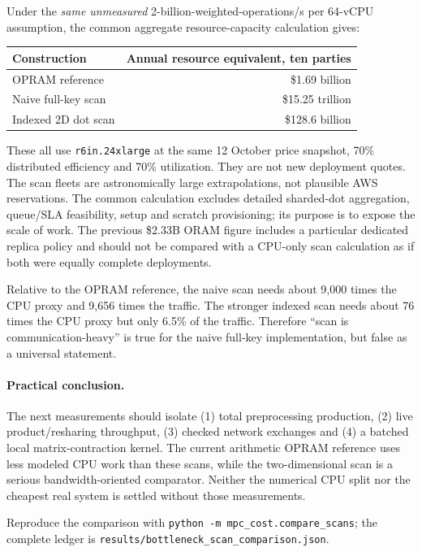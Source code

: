 Under the \emph{same unmeasured} 2-billion-weighted-operations/s per 64-vCPU assumption,
the common aggregate resource-capacity calculation gives:
\begin{center}\begin{tabular}{lr}\toprule
Construction & Annual resource equivalent, ten parties\\\midrule
OPRAM reference & \$1.69 billion\\
Naive full-key scan & \$15.25 trillion\\
Indexed 2D dot scan & \$128.6 billion\\\bottomrule\end{tabular}\end{center}
These all use \texttt{r6in.24xlarge} at the same 12 October price snapshot, 70\%
distributed efficiency and 70\% utilization. They are not new deployment quotes.
The scan fleets are astronomically large extrapolations, not plausible AWS
reservations. The common calculation excludes detailed sharded-dot aggregation,
queue/SLA feasibility, setup and scratch provisioning; its purpose is to expose
the scale of work. The previous \$2.33B ORAM figure includes a particular dedicated
replica policy and should not be compared with a CPU-only scan calculation as
if both were equally complete deployments.

Relative to the OPRAM reference, the naive scan needs about 9,000 times the CPU
proxy and 9,656 times the traffic. The stronger indexed scan needs about 76 times
the CPU proxy but only 6.5\% of the traffic. Therefore ``scan is communication-heavy''
is true for the naive full-key implementation, but false as a universal statement.

\paragraph{Practical conclusion.}
The next measurements should isolate (1) total preprocessing production,
(2) live product/resharing throughput, (3) checked network exchanges and
(4) a batched local matrix-contraction kernel. The current arithmetic OPRAM
reference uses less modeled CPU work than these scans, while the two-dimensional scan is
a serious bandwidth-oriented comparator. Neither the numerical CPU split nor
the cheapest real system is settled without those measurements.

Reproduce the comparison with \texttt{python -m mpc\_cost.compare\_scans};
the complete ledger is \texttt{results/bottleneck\_scan\_comparison.json}.
